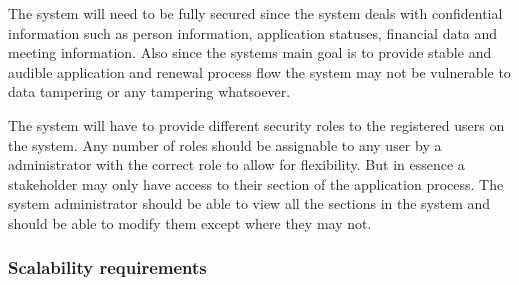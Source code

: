 \documentclass[12pt]{article}
\begin{document}
		\begin{flushleft}
		
		The system will need to be fully secured since the system deals with confidential information such as person information, application statuses, financial data and meeting information. Also since the systems main goal is to provide stable and audible application and renewal process flow the system may not be vulnerable to data tampering or any tampering whatsoever. \\
		\vspace{0.1in}
		  
		The system will have to provide different security roles to the registered users on the system. Any number of roles should be assignable to any user by a administrator with the correct role to allow for flexibility. 
		But in essence a stakeholder may only have access to their section of the application process. The system administrator should be able to view all the sections in the system and should be able to modify them except where they may not.
		
		\end{flushleft}
		
		\vspace{0.1in}
		
		\subsubsection{Scalability requirements}
		
\end{document}

